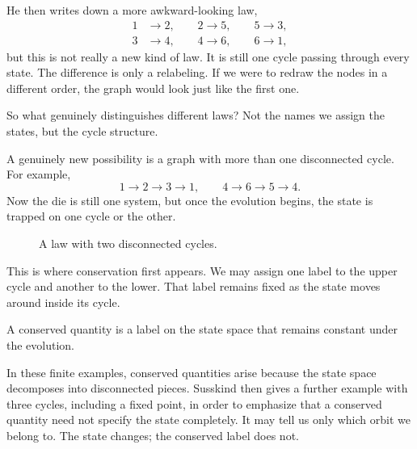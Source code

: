 He then writes down a more awkward-looking law,
\[
\begin{aligned}
1&\to 2,\qquad 2\to 5,\qquad 5\to 3,\\
3&\to 4,\qquad 4\to 6,\qquad 6\to 1,
\end{aligned}
\]
but this is not really a new kind of law. It is still one cycle passing through every state. The difference is only a relabeling. If we were to redraw the nodes in a different order, the graph would look just like the first one.

So what genuinely distinguishes different laws? Not the names we assign the states, but the cycle structure.

A genuinely new possibility is a graph with more than one disconnected cycle. For example,
\[
1\to 2\to 3\to 1,
\qquad
4\to 6\to 5\to 4.
\]
Now the die is still one system, but once the evolution begins, the state is trapped on one cycle or the other.

\begin{figure}
\centering
{}
\caption{A law with two disconnected cycles.}
\end{figure}

This is where conservation first appears. We may assign one label to the upper cycle and another to the lower. That label remains fixed as the state moves around inside its cycle.

\begin{definition}
A conserved quantity is a label on the state space that remains constant under the evolution.
\end{definition}

In these finite examples, conserved quantities arise because the state space decomposes into disconnected pieces. Susskind then gives a further example with three cycles, including a fixed point, in order to emphasize that a conserved quantity need not specify the state completely. It may tell us only which orbit we belong to. The state changes; the conserved label does not.


